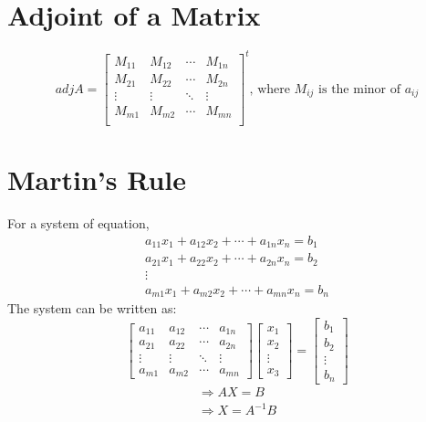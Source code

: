 \documentclass[openany, oneside]{book}
\begin{document}
\section{Adjoint of a Matrix}
\begin{equation}
adj A=\begin{bmatrix}M_{11}&M_{12}&\cdots&M_{1n}\\ M_{21}&M_{22}&\cdots&M_{2n}\\ \vdots&\vdots&\ddots&\vdots\\M_{m1}&M_{m2}&\cdots&M_{mn}\\ \end{bmatrix}^t\text{, where } M_{ij} \text{ is the minor of } a_{ij} 
\end{equation}

\section{Martin's Rule}
For a system of equation,
\begin{align}
a_{11}x_1+a_{12}x_2+\cdots+a_{1n}x_n=b_1\nonumber\\
a_{21}x_1+a_{22}x_2+\cdots+a_{2n}x_n=b_2\nonumber\\
\vdots\nonumber\\
a_{m1}x_1+a_{m2}x_2+\cdots+a_{mn}x_n=b_n\nonumber
\end{align}
The system can be written as:
\begin{equation}
\begin{bmatrix}a_{11}&a_{12}&\cdots&a_{1n}\\a_{21}&a_{22}&\cdots&a_{2n}\\ \vdots&\vdots&\ddots&\vdots \\a_{m1}&a_{m2}&\cdots&a_{mn}\end{bmatrix} \begin{bmatrix}x_1\\x_2\\ \vdots \\ x_3\end{bmatrix}=\begin{bmatrix}b_1 \\ b_2 \\ \vdots \\ b_n\end{bmatrix}
\end{equation}
\begin{align}
\Rightarrow AX=B\\
\Rightarrow X=A^{-1}B
\end{align}
\end{document}
